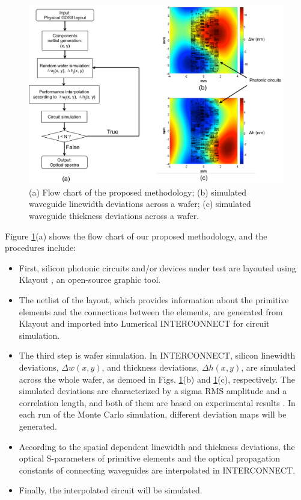 \documentclass[journal]{spie}
\begin{document}
\begin{figure}[h]
    \centering
    \label{flow_chart}\includegraphics[width=13cm]{flow_chart.pdf}
    \caption{(a) Flow chart of the proposed methodology; (b) simulated waveguide linewidth deviations across a wafer; (c) simulated waveguide thickness deviations across a wafer.}
    \label{flow_chart}  
\end{figure}

Figure \ref{flow_chart}(a) shows the flow chart of our proposed methodology, and the procedures include: 
\begin{itemize}
\item First, silicon photonic circuits and/or devices under test are layouted using Klayout \cite{www_klayout}, an open-source graphic tool. 
\item
The netlist of the layout, which provides information about the primitive elements and the connections between the elements, are generated from Klayout and imported into Lumerical INTERCONNECT for circuit simulation. 
\item
The third step is wafer simulation. In INTERCONNECT, silicon linewidth deviations, $\Delta w(x,y)$, and thickness deviations, $\Delta h(x,y)$, are simulated across the whole wafer, as demoed in Figs. \ref{flow_chart}(b) and \ref{flow_chart}(c), respectively. The simulated deviations are characterized by a sigma RMS amplitude and a correlation length, and both of them are based on experimental results \cite{lukas14:OFC,hochberg:wafer}. In each run of the Monte Carlo simulation, different deviation maps will be generated. 
\item
According to the spatial dependent linewidth and thickness deviations, the optical S-parameters of primitive elements and the optical propagation constants of connecting waveguides are interpolated in INTERCONNECT. 
\item
Finally, the interpolated circuit will be simulated. 
\end{itemize}
\end{document}

